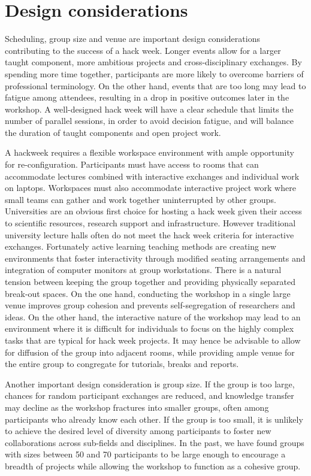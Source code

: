 \section*{Design considerations}

Scheduling, group size and venue are important design considerations contributing to the success of a hack week.   
Longer events allow for a larger taught component, more ambitious projects and cross-disciplinary exchanges. 
By spending more time together, participants are more likely to overcome barriers of professional terminology.
On the other hand, events that are too long may lead to fatigue among attendees, resulting in a drop in positive outcomes later in the workshop.
A well-designed hack week will have a clear schedule that limits the number of parallel sessions, in order to avoid decision fatigue, and will balance the duration of taught components and open project work. 

A hackweek requires a flexible workspace environment with ample opportunity for re-configuration. 
Participants must have access to rooms that can accommodate lectures combined with interactive exchanges and individual work on laptops. 
Workspaces must also accommodate interactive project work where small teams can gather and work together uninterrupted by other groups.    
Universities are an obvious first choice for hosting a hack week given their access to scientific resources, research support and infrastructure. 
However traditional university lecture halls often do not meet the hack week criteria for interactive exchanges.
Fortunately active learning teaching methods are creating new environments that foster interactivity through modified seating arrangements and integration of computer monitors at group workstations. There is a natural tension between keeping the group together and providing physically separated break-out spaces. On the one hand, conducting the workshop in a single large venue improves group cohesion and prevents self-segregation of researchers and ideas. On the other hand, the interactive nature of the workshop may lead to an environment where it is difficult for individuals to focus on the highly complex tasks that are typical for hack week projects. It may hence be advisable to allow for diffusion of the group into adjacent rooms, while providing ample venue for the entire group to congregate for tutorials, breaks and reports.

Another important design consideration is group size.
If the group is too large, chances for random participant exchanges are reduced, and knowledge transfer may decline as the workshop fractures into smaller groups, often among participants who already know each other.
If the group is too small, it is unlikely to achieve the desired level of diversity among participants to foster new collaborations across sub-fields and disciplines.
In the past, we have found groups with sizes between 50 and 70 participants to be large enough to encourage a breadth of projects while allowing the workshop to function as a cohesive group.

